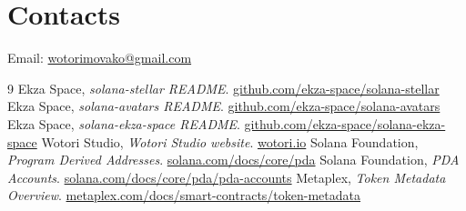 \documentclass[10pt,twocolumn]{article}
\begin{document}
\section{Contacts}
Email: \href{mailto:wotorimovako@gmail.com}{wotorimovako@gmail.com}

\small
\raggedright
\begin{thebibliography}{9}
 Ekza Space, \emph{solana-stellar README}. \href{https://github.com/ekza-space/solana-stellar}{github.com/ekza-space/solana-stellar}
 Ekza Space, \emph{solana-avatars README}. \href{https://github.com/ekza-space/solana-avatars}{github.com/ekza-space/solana-avatars}
 Ekza Space, \emph{solana-ekza-space README}. \href{https://github.com/ekza-space/solana-ekza-space}{github.com/ekza-space/solana-ekza-space}
 Wotori Studio, \emph{Wotori Studio website}. \href{https://www.wotori.io/}{wotori.io}
 Solana Foundation, \emph{Program Derived Addresses}. \href{https://solana.com/docs/core/pda}{solana.com/docs/core/pda}
 Solana Foundation, \emph{PDA Accounts}. \href{https://solana.com/docs/core/pda/pda-accounts}{solana.com/docs/core/pda/pda-accounts}
 Metaplex, \emph{Token Metadata Overview}. \href{https://www.metaplex.com/docs/smart-contracts/token-metadata}{metaplex.com/docs/smart-contracts/token-metadata}
\end{thebibliography}
\end{document}
